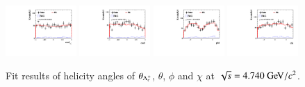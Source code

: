 \begin{figure}[H]\centering
    \includegraphics[width=0.24\textwidth]{figure/polarimetery/angular_plots/pkpi_4740_cos_theta0.pdf}
    \includegraphics[width=0.24\textwidth]{figure/polarimetery/angular_plots/pkpi_4740_cos_theta1.pdf}
    \includegraphics[width=0.24\textwidth]{figure/polarimetery/angular_plots/pkpi_4740_phi1.pdf}
    \includegraphics[width=0.24\textwidth]{figure/polarimetery/angular_plots/pkpi_4740_phi2.pdf}
    \caption{Fit results of helicity angles of $\theta_{\Lambda_{c}^{+}}$, $\theta$, $\phi$ and $\chi$ at $\sqrt{s} = 4.740\gev/c^2$.}
\label{fig:fit_angular_s7}
\end{figure}

